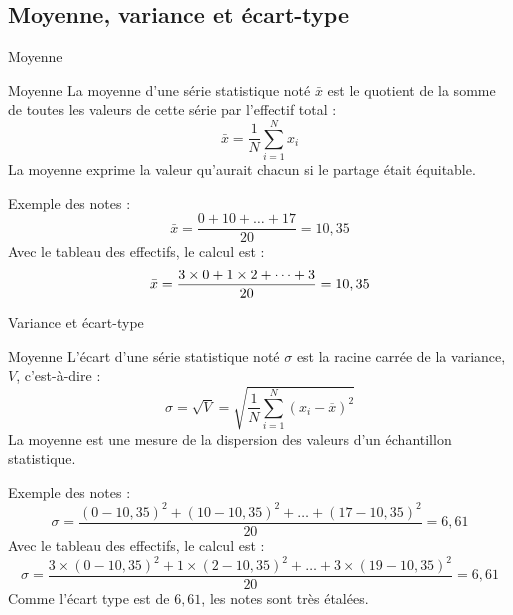 \documentclass[10pt, french]{beamer}
\begin{document}
\subsection[Moyenne et variance]{Moyenne, variance et écart-type}
\begin{frame}{Moyenne}
\begin{block}{Moyenne}
La moyenne d'une série statistique noté $\bar x$ est le quotient  de la somme de toutes les valeurs de cette série par l'effectif total :
$$\bar x =\frac 1 N \sum_{i=1}^N x_i$$
La moyenne exprime la valeur qu’aurait chacun si le partage était équitable.
\end{block}
Exemple des notes :
$$\bar x =\frac{0+  10 +\dots + 17}{20}=10,35$$
Avec le tableau des effectifs, le calcul est :
$$\bar x =\frac{3\times 0+  1 \times 2+\dots +  3\time 19}{20}=10,35$$
\end{frame}

\begin{frame}{Variance et écart-type}
\begin{block}{Moyenne}
L'écart d'une série statistique noté $\sigma$ est  la racine carrée de la variance, $V$, c'est-à-dire :
$$ \sigma ={\sqrt {V}}={\sqrt {{\frac {1}{N}}\sum _{i=1}^{N}(x_{i}-{\overline {x}})^{2}}}$$
La moyenne est une mesure de la dispersion des valeurs d'un échantillon statistique. 
\end{block}
Exemple des notes :
$$\sigma =\frac{ (0-10,35)^2+  (10-10,35)^2 +\dots + (17-10,35)^2}{20}=6,61$$
Avec le tableau des effectifs, le calcul est :
$$\sigma =\frac{3\times (0-10,35)^2+  1 \times (2-10,35)^2+\dots +  3\times (19-10,35)^2}{20}=6,61$$
Comme l'écart type est de $6,61$, les notes sont très étalées. 
\end{frame}
\end{document}
